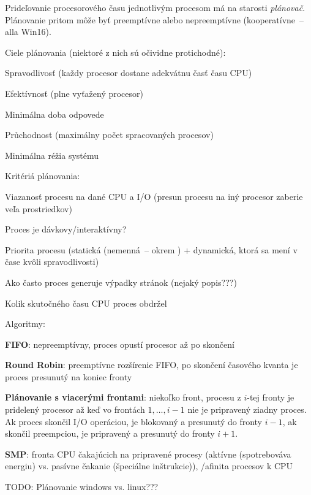 Prideľovanie procesorového času jednotlivým procesom má na starosti \emph{plánovač}. Plánovanie pritom môže byť preemptívne alebo nepreemptívne (kooperatívne~-- alla Win16).

\begin{obecne}{Ciele plánovania (niektoré z nich sú očividne protichodné):}
\begin{pitemize}
	\item Spravodlivosť (každy procesor dostane adekvátnu časť času CPU)
	\item Efektívnosť (plne vyťažený procesor)
	\item Minimálna doba odpovede
	\item Průchodnost (maximálny počet spracovaných procesov)
	\item Minimálna réžia systému
\end{pitemize}
\end{obecne}

\begin{obecne}{Kritériá plánovania:}
\begin{pitemize}
	\item Viazanosť procesu na dané CPU a I/O (presun procesu na iný procesor zaberie veľa prostriedkov)
	\item Proces je dávkovy/interaktívny?
	\item Priorita procesu (statická (nemenná~-- okrem ) + dynamická, ktorá sa mení v čase kvôli spravodlivosti)
	\item Ako často proces generuje výpadky stránok (nejaký popis???)
	\item Kolik skutočného času CPU proces obdržel
\end{pitemize}
\end{obecne}

\begin{obecne}{Algoritmy:}
\begin{pitemize}
	\item \textbf{FIFO}: nepreemptívny, proces opustí procesor až po skončení

	\item \textbf{Round Robin}: preemptívne rozšírenie FIFO, po skončení časového kvanta je proces presunutý na koniec fronty

	\item \textbf{Plánovanie s viacerými frontami}: niekoľko front, procesu z $i$-tej fronty je pridelený procesor až keď vo frontách $1, \dots, i-1$ nie je pripravený ziadny proces. Ak proces skončil I/O operáciou, je blokovaný a presunutý do fronty $i-1$, ak skončil preempciou, je pripravený a presunutý do fronty $i+1$.

	\item \textbf{SMP}: fronta CPU čakajúcich na pripravené procesy (aktívne (spotrebováva energiu) vs. pasívne čakanie (špeciálne inštrukcie)), /afinita procesov k CPU

	\item TODO: Plánovanie windows vs. linux???
\end{pitemize}
\end{obecne}
